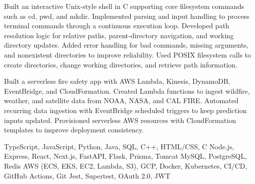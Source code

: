 Built an interactive Unix-style shell in C supporting core filesystem commands such as cd, pwd, and mkdir.
Implemented parsing and input handling to process terminal commands through a continuous execution loop.
Developed path resolution logic for relative paths, parent-directory navigation, and working directory updates.
Added error handling for bad commands, missing arguments, and nonexistent directories to improve reliability.
Used POSIX filesystem calls to create directories, change working directories, and retrieve path information.


Built a serverless fire safety app with AWS Lambda, Kinesis, DynamoDB, EventBridge, and CloudFormation.
Created Lambda functions to ingest wildfire, weather, and satellite data from NOAA, NASA, and CAL FIRE.
Automated recurring data ingestion with EventBridge scheduled triggers to keep prediction inputs updated.
Provisioned serverless AWS resources with CloudFormation templates to improve deployment consistency.


TypeScript, JavaScript, Python, Java, SQL, C++, HTML/CSS, C
Node.js, Express, React, Next.js, FastAPI, Flask, Prisma, Tomcat
MySQL, PostgreSQL, Redis
AWS (ECS, EKS, EC2, Lambda, S3), GCP, Docker, Kubernetes, CI/CD, GitHub Actions, Git
Jest, Supertest, OAuth 2.0, JWT




